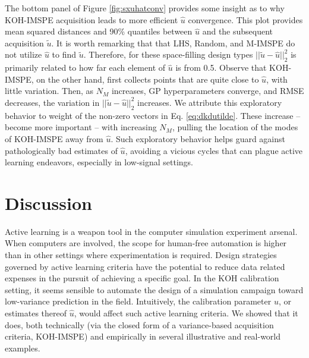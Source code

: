 \documentclass[
]{article}
\begin{document}
The bottom panel of Figure \ref{fig:sxuhatconv} provides some insight as to why KOH-IMSPE acquisition leads to more efficient \(\hat{u}\) convergence. This plot provides mean squared distances and 90\% quantiles between \(\hat{u}\) and the subsequent acquisition \(\tilde{u}\). It is worth remarking that that LHS, Random, and M-IMSPE do not utilize \(\hat{u}\) to find \(\tilde{u}\). Therefore, for these space-filling design types \(||\tilde{u} - \hat{u}||^2_2\) is primarily related to how far each element of \(\hat{u}\) is from 0.5. Observe that KOH-IMSPE, on the other hand, first collects points that are quite close to \(\hat{u}\), with little variation. Then, as \(N_M\) increases, GP hyperparameters converge, and RMSE decreases, the variation in \(||\tilde{u} - \hat{u}||^2_2\) increases. We attribute this exploratory behavior to weight of the non-zero vectors in Eq. \eqref{eq:dkdutilde}. These increase -- become more important -- with increasing \(N_M\), pulling the location of the modes of KOH-IMSPE away from \(\hat{u}\). Such exploratory behavior helps guard against pathologically bad estimates of \(\hat{u}\), avoiding a vicious cycles that can plague active learning endeavors, especially in low-signal settings.

\hypertarget{discussec}{%
\section{Discussion}\label{discussec}}

Active learning is a weapon tool in the computer simulation experiment arsenal. When computers are involved, the scope for human-free automation is higher than in other settings where experimentation is required. Design strategies governed by active learning criteria have the potential to reduce data related expenses in the pursuit of achieving a specific goal. In the KOH calibration setting, it seems sensible to automate the design of a simulation campaign toward low-variance prediction in the field. Intuitively, the calibration parameter \(u\), or estimates thereof \(\hat{u}\), would affect such active learning criteria. We showed that it does, both technically (via the closed form of a variance-based acquisition criteria, KOH-IMSPE) and empirically in several illustrative and real-world examples.
\end{document}
